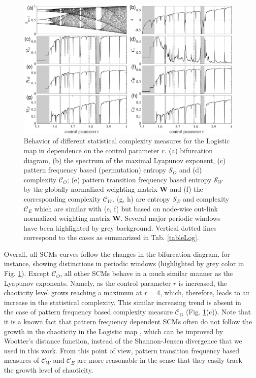 \documentclass[12pt,aip,cha,reprint,nofootinbib]{revtex4-1}
\begin{document}
\begin{figure}
	\centering 
	\includegraphics[width=2\columnwidth]{logisticEntropy.pdf}
\caption{\small{Behavior of different statistical complexity measures for the Logistic map in dependence on the control parameter $r$. (a) bifurcation diagram, (b) the spectrum of the maximal Lyapunov exponent, (c) pattern frequency based (permutation) entropy $\mathcal{S}_O$ and (d) complexity $\mathcal{C}_O$; (e) pattern transition frequency based entropy $\mathcal{S}_W$ by the globally normalized weighting matrix $\mathbf{W}$ and (f) the corresponding complexity $\mathcal{C}_W$. (g, h) are entropy $\mathcal{S}_E$ and complexity $\mathcal{C}_E$ which are similar with (e, f) but based on node-wise out-link normalized weighting matrix $\mathbf{W}$. Several major periodic windows have been highlighted by grey background. Vertical dotted lines correspond to the cases as summarized in Tab. \ref{tableLog}. } \label{fig:bifurcation}}
\end{figure}

Overall, all SCMs curves follow the changes in the bifurcation diagram, for instance, showing distinctions in periodic windows  (highlighted by grey color in Fig. \ref{fig:bifurcation}). Except $\mathcal{C}_O$, all other SCMs behave in a much similar manner as the Lyapunov exponents. Namely, as the control parameter $r$ is increased, the chaoticity level grows reaching a maximum at $r = 4$, which, therefore, leads to an increase in the statistical complexity. This similar increasing trend is absent in the case of pattern frequency based complexity measure $\mathcal{C}_O$ (Fig. \ref{fig:bifurcation}(c)). Note that it is a known fact that pattern frequency dependent SCMs often do not follow the growth in the chaoticity in the Logistic map \cite{MartinPLA2003}, which can be improved by Wootter's distance function, instead of the Shannon-Jensen divergence that we used in this work. From this point of view, pattern transition frequency based measures of $\mathcal{C}_W$ and $\mathcal{C}_E$ are more reasonable in the sense that they easily track the growth level of chaoticity. 
\end{document}
